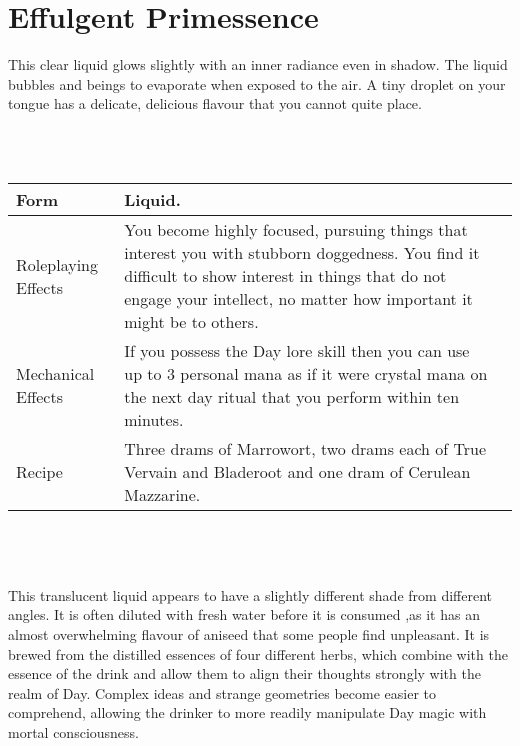 \documentclass[a5paper,pagesize,10pt,bibtotoc,pointlessnumbers,
normalheadings,DIV=9,twoside=false]{scrbook}
\newcommand\potion[7]{
    \section{#1}
    #2
    \\\\
    \begin{tabular}{| p{.18\linewidth} | p{.74\textwidth} |}
        \hline
        Form & #3 \\
        \hline
        Roleplaying Effects & #4 \\
        \hline
        Mechanical Effects & #5 \\
        \hline
        Recipe & #6 \\
        \hline
    \end{tabular}
    \\\\\\
    #7
    \newpage
}
\begin{document}
\potion{Effulgent Primessence}{
    This clear liquid glows slightly with an inner radiance even in shadow. The liquid bubbles and beings to evaporate when exposed to the air. A tiny droplet on your tongue has a delicate, delicious flavour that you cannot quite place.
}{Infusion.}{
    You become calm and cerebral, fascinated by thoughts, ideas and knowledge. You are disinclined to physical action where mental action might be sufficient. Your movements and thoughts become precise and ordered
}{
    If you possess the Day lore skill, then you gain one additional effective rank to the next day ritual that you perform within ten minutes, subject to the normal rules for effective skill. This is a tonic; the effect of any other tonic you have drunk immediately ends..
}{
    Two drams of Marrowort and one dram each of True Vervain, Cerulean Mazzarine and Bladeroot, and one crystallised mana.
}{
    This delicate, clear liquid often glows slightly in shadowed areas. It rapidly sublimes when exposed to air, becoming a fine vapour that is inhaled by a ritual magician to enhance their perception of the magic of Day. By helping the ritualist to focus their thoughts, they can achieve a synergy with the concepts and themes embodied by that realm.\\\\Overuse of Effulgent Primessence can lead to increasing lassitude. It becomes increasingly hard to care about physical things, and there are some rare cases where magicians have starved to death, lacking the inclination to move from their couches to satisfy their hunger or thirst. Users remain coherent, intelligent and capable of rational discourse, which can often hide the signs of Effulgent Primessence abuse.
}

\potion{Lucent Quintessence}{
    This clear liquid seems to have a slightly different colour from different angles. It smells strongly of aniseed, and a tiny droplet on your tongue reveals it to have an almost overwhelming flavour of aniseed as well.
}{Liquid.}{
    You become highly focused, pursuing things that interest you with stubborn doggedness. You find it difficult to show interest in things that do not engage your intellect, no matter how important it might be to others.
}{
    If you possess the Day lore skill then you can use up to 3 personal mana as if it were crystal mana on the next day ritual that you perform within ten minutes.
}{
    Three drams of Marrowort, two drams each of True Vervain and Bladeroot and one dram of Cerulean Mazzarine.
}{
    This translucent liquid appears to have a slightly different shade from different angles. It is often diluted with fresh water before it is consumed ,as it has an almost overwhelming flavour of aniseed that some people find unpleasant. It is brewed from the distilled essences of four different herbs, which combine with the essence of the drink and allow them to align their thoughts strongly with the realm of Day. Complex ideas and strange geometries become easier to comprehend, allowing the drinker to more readily manipulate Day magic with mortal consciousness.
}
\end{document}
